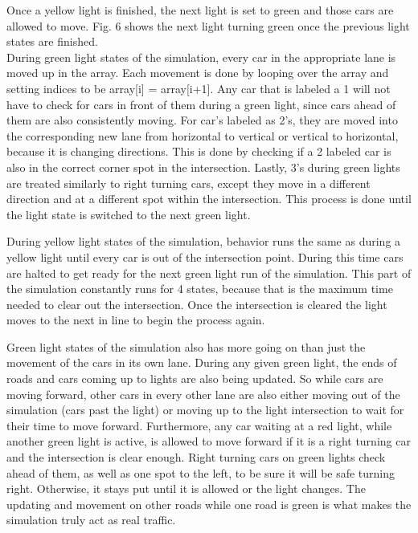 \documentclass[conference]{IEEEtran}
\begin{document}
Once a yellow light is finished, the next light is set to green and those cars are allowed to move. Fig. 6 shows the next light turning green once the previous light states are finished. \\

\hspace*{.2cm} During green light states of the simulation, every car in the appropriate lane is moved up in the array. Each movement is done by looping over the array and setting indices to be array[i] = array[i+1]. Any car that is labeled a 1 will not have to check for cars in front of them during a green light, since cars ahead of them are also consistently moving. For car's labeled as 2's, they are moved into the corresponding new lane from horizontal to vertical or vertical to horizontal, because it is changing directions. This is done by checking if a 2 labeled car is also in the correct corner spot in the intersection. Lastly, 3's during green lights are treated similarly to right turning cars, except they move in a different direction and at a different spot within the intersection. This process is done until the light state is switched to the next green light. 

\hspace*{.2cm} During yellow light states of the simulation, behavior runs the same as during a yellow light until every car is out of the intersection point. During this time cars are halted to get ready for the next green light run of the simulation. This part of the simulation constantly runs for 4 states, because that is the maximum time needed to clear out the intersection. Once the intersection is cleared the light moves to the next in line to begin the process again.

\hspace*{.2cm} Green light states of the simulation also has more going on than just the movement of the cars in its own lane. During any given green light, the ends of roads and cars coming up to lights are also being updated. So while cars are moving forward, other cars in every other lane are also either moving out of the simulation (cars past the light) or moving up to the light intersection to wait for their time to move forward. Furthermore, any car waiting at a red light, while another green light is active, is allowed to move forward if it is a right turning car and the intersection is clear enough. Right turning cars on green lights check ahead of them, as well as one spot to the left, to be sure it will be safe turning right. Otherwise, it stays put until it is allowed or the light changes. The updating and movement on other roads while one road is green is what makes the simulation truly act as real traffic.
\end{document}
